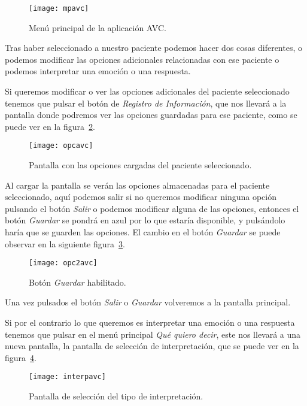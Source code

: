 \begin{figure}[H]
	\centering
	\texttt{[image: mpavc]}
	\caption{Menú principal de la aplicación AVC.}
	\label{fig:mpavc}
\end{figure}

Tras haber seleccionado a nuestro paciente podemos hacer dos cosas diferentes, o podemos modificar las opciones adicionales relacionadas con ese paciente o podemos interpretar una emoción o una respuesta.

Si queremos modificar o ver las opciones adicionales del paciente seleccionado tenemos que pulsar el botón de \textit{Registro de Información}, que nos llevará a la pantalla donde podremos ver las opciones guardadas para ese paciente, como se puede ver en la figura~\ref{fig:opcavc}.

\begin{figure}[htp]
	\centering
	\texttt{[image: opcavc]}
	\caption{Pantalla con las opciones cargadas del paciente seleccionado.}
	\label{fig:opcavc}
\end{figure}

Al cargar la pantalla se verán las opciones almacenadas para el paciente seleccionado, aquí podemos salir si no queremos modificar ninguna opción pulsando el botón \textit{Salir} o podemos modificar alguna de las opciones, entonces el botón \textit{Guardar} se pondrá en azul por lo que estaría disponible, y pulsándolo haría que se guarden las opciones. El cambio en el botón \textit{Guardar} se puede observar en la siguiente figura~\ref{fig:opc2avc}.

\begin{figure}[htp]
	\centering
	\texttt{[image: opc2avc]}
	\caption{Botón \textit{Guardar} habilitado.}
	\label{fig:opc2avc}
\end{figure}

Una vez pulsados el botón \textit{Salir} o \textit{Guardar} volveremos a la pantalla principal.

Si por el contrario lo que queremos es interpretar una emoción o una respuesta tenemos que pulsar en el menú principal \textit{Qué quiero decir}, este nos llevará a una nueva pantalla, la pantalla de selección de interpretación, que se puede ver en la figura~\ref{fig:interpavc}.

\begin{figure}[htp]
	\centering
	\texttt{[image: interpavc]}
	\caption{Pantalla de selección del tipo de interpretación.}
	\label{fig:interpavc}
\end{figure}

